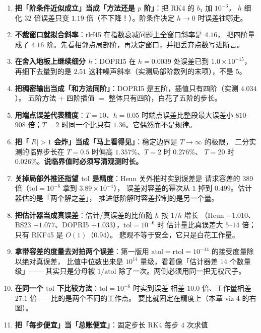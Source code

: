 \begin{enumerate}
  \item \textbf{把「阶条件近似成立」当成「方法还是 $p$ 阶」}：把 RK4 的 $b_1$ 加 $10^{-3}$，
        $h$ 细化 $32$ 倍误差只变 $1.19$ 倍（不下降！）。阶条件决定 $h\to0$ 时误差往哪走。
  \item \textbf{不裁窗口就拟合斜率}：rkf45 在指数衰减问题上全窗口斜率是 $4.16$，
        把四阶量成了 $4.16$ 阶。先看相邻点局部阶，再决定窗口，并把丢弃点数写进断言。
  \item \textbf{在舍入地板上继续细分 $h$}：DOPRI5 在 $h=0.0039$ 处误差已到 $1.0\times10^{-15}$，
        再细下去量到的是 $2.51$ 这种噪声斜率（实测局部阶数列的末项），不是 $5$。
  \item \textbf{把稠密输出当成「和方法同阶」}：DOPRI5 是五阶，插值只有四阶（实测 $4.034$）。
        五阶方法 $+$ 四阶插值 $=$ 整体只有四阶，白花了五阶的步长。
  \item \textbf{用端点误差代表精度}：$T=10$、$h=0.05$ 时端点误差比整段最大误差小
        $810$--$908$ 倍；$T=2$ 时同一个比只有 $1.36$。它偶然而不是规律。
  \item \textbf{把「$|R|>1$ 会炸」当成「马上看得见」}：稳定边界是 $T\to\infty$ 的极限，
        二分实测的临界步长在 $T=0.5$ 时偏高 $1.357\%$、$T=2$ 时 $0.276\%$、
        $T=20$ 时 $0.026\%$。\textbf{说临界值时必须写清观测时长。}
  \item \textbf{关掉局部外推还指望 $\mathrm{tol}$ 是精度}：Heun 关外推时实到误差是
        请求容差的 $389$ 倍（$\mathrm{tol}=10^{-6}$ 拿到 $3.89\times10^{-4}$），
        误差对容差的幂次从 $1$ 掉到 $0.499$。估计器估的是「两个解之差」，
        推进低阶解时容差控制的是另一个量。
  \item \textbf{把估计器当成真误差}：估计/真误差的比值随 $h$ 按 $1/h$ 增长
        （Heun $+1.010$、BS23 $+1.077$、DOPRI5 $+1.033$），$\mathrm{tol}=10^{-6}$ 时
        估计量比真误差大 $5$--$14$ 倍；只有 RKF45 是 $O(1)$（$0.94$）。
        悲观不等于安全，它只是白花工作量。
  \item \textbf{拿带容差的度量去对拍两个误差}：第一版用
        $\mathrm{atol}=\mathrm{rtol}=10^{-14}$ 的接受度量除以绝对真误差，
        比值中位数出来是 $10^{14}$ 量级，看着像「估计器差 $14$ 个数量级」——
        其实只是分母被 $1/\mathrm{atol}$ 除了一次。两侧必须用同一把无权尺子。
  \item \textbf{在同一个 $\mathrm{tol}$ 下比较方法}：$\mathrm{tol}=10^{-6}$ 时实到误差
        相差 $10.0$ 倍、工作量相差 $27.1$ 倍——比的是两个不同的工作点。
        要比就固定在精度上（本章 viz 4 的右图）。
  \item \textbf{把「每步便宜」当「总账便宜」}：固定步长 RK4 每步 $4$ 次求值

\end{enumerate}

